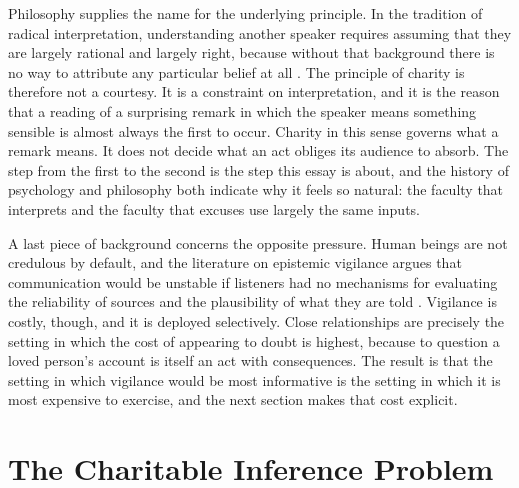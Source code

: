 \documentclass[11pt]{article}
\theoremstyle{definition}
\theoremstyle{remark}
\begin{document}
Philosophy supplies the name for the underlying principle. In the tradition of radical interpretation, understanding another speaker requires assuming that they are largely rational and largely right, because without that background there is no way to attribute any particular belief at all \citep{davidson1973}. The principle of charity is therefore not a courtesy. It is a constraint on interpretation, and it is the reason that a reading of a surprising remark in which the speaker means something sensible is almost always the first to occur. Charity in this sense governs what a remark means. It does not decide what an act obliges its audience to absorb. The step from the first to the second is the step this essay is about, and the history of psychology and philosophy both indicate why it feels so natural: the faculty that interprets and the faculty that excuses use largely the same inputs.

A last piece of background concerns the opposite pressure. Human beings are not credulous by default, and the literature on epistemic vigilance argues that communication would be unstable if listeners had no mechanisms for evaluating the reliability of sources and the plausibility of what they are told \citep{sperber2010}. Vigilance is costly, though, and it is deployed selectively. Close relationships are precisely the setting in which the cost of appearing to doubt is highest, because to question a loved person's account is itself an act with consequences. The result is that the setting in which vigilance would be most informative is the setting in which it is most expensive to exercise, and the next section makes that cost explicit.

\section{The Charitable Inference Problem}\label{sec:cip}
\end{document}
